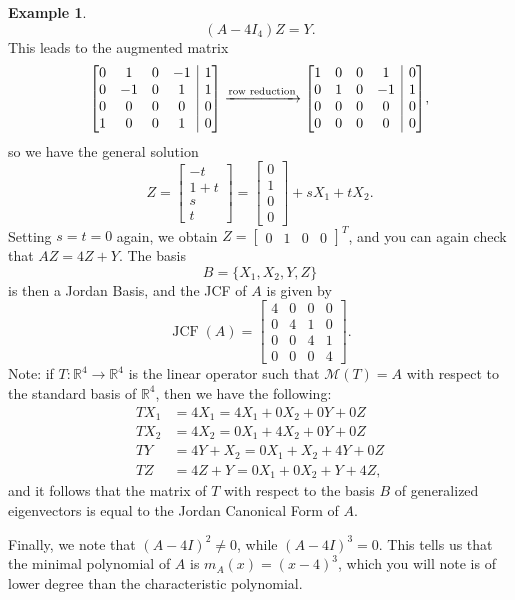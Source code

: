\documentclass[12pt,letterpaper]{article}
\makeatletter
\theoremstyle{definition}
\newtheorem{example}{Example}
\newenvironment{amatrix}[1]{%
  \left[\begin{array}{@{}*{#1}{c}|c@{}}
}{%
  \end{array}\right]
}
\newcommand{\M}{\mathcal{M}}
\newcommand{\R}{\mathbb{R}}
\DeclareMathOperator{\jcf}{JCF}
\makeatother
\begin{document}
\begin{example}
\[
 (A-4I_4)Z=Y.
\]
This leads to the augmented matrix
\[
 \begin{amatrix}{4}
  0&1&0&-1&1\\0&-1&0&1&1\\0&0&0&0&0\\1&0&0&1&0
 \end{amatrix}\xrightarrow[]{\text{row reduction}}
 \begin{amatrix}{4}
  1&0&0&1&0\\0&1&0&-1&1\\0&0&0&0&0\\0&0&0&0&0
 \end{amatrix},
\]
so we have the general solution
\[
 Z = \begin{bmatrix}-t\\1+t\\s\\t\end{bmatrix} = \begin{bmatrix}0\\1\\0\\0\end{bmatrix}+sX_1+tX_2.
\]
Setting $s=t=0$ again, we obtain $Z=\begin{bmatrix}0&1&0&0\end{bmatrix}^T$, and you can again check that $AZ = 4Z+Y$. The basis
\[
 B=\{X_1,X_2,Y,Z\}
\]
is then a Jordan Basis, and the JCF of $A$ is given by
\[
 \jcf(A) = \begin{bmatrix}4&0&0&0\\0&4&1&0\\0&0&4&1\\0&0&0&4\end{bmatrix}.
\]
Note: if $T:\R^4\to \R^4$ is the linear operator such that $\M(T)=A$ with respect to the standard basis of $\R^4$, then we have the following:
\begin{align*}
 TX_1 & = 4X_1 = 4X_1+0X_2+0Y+0Z\\
 TX_2 & = 4X_2 = 0X_1+4X_2+0Y+0Z\\
 TY & = 4Y+X_2 = 0X_1+X_2+4Y+0Z\\
 TZ & = 4Z+Y = 0X_1+0X_2+Y+4Z,
\end{align*}
and it follows that the matrix of $T$ with respect to the basis $B$ of generalized eigenvectors is equal to the Jordan Canonical Form of $A$.

Finally, we note that $(A-4I)^2\neq 0$, while $(A-4I)^3=0$. This tells us that the minimal polynomial of $A$ is $m_A(x)=(x-4)^3$, which you will note is of lower degree than the characteristic polynomial.
\end{example}
\end{document}
